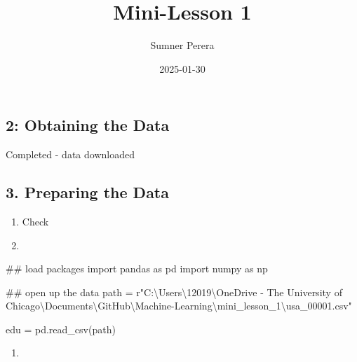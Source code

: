 \documentclass[
  letterpaper,
  DIV=11,
  numbers=noendperiod]{scrartcl}
\title{Mini-Lesson 1}
\author{Sumner Perera}
\date{2025-01-30}
\newenvironment{Shaded}{\begin{snugshade}}{\end{snugshade}}
\newcommand{\CommentTok}[1]{\textcolor[rgb]{0.37,0.37,0.37}{#1}}
\newcommand{\ImportTok}[1]{\textcolor[rgb]{0.00,0.46,0.62}{#1}}
\newcommand{\NormalTok}[1]{\textcolor[rgb]{0.00,0.23,0.31}{#1}}
\newcommand{\OperatorTok}[1]{\textcolor[rgb]{0.37,0.37,0.37}{#1}}
\newcommand{\VerbatimStringTok}[1]{\textcolor[rgb]{0.13,0.47,0.30}{#1}}
\providecommand{\tightlist}{%
  \setlength{\itemsep}{0pt}\setlength{\parskip}{0pt}}\usepackage{longtable,booktabs,array}
\begin{document}
\maketitle


\subsection{2: Obtaining the Data}\label{obtaining-the-data}

Completed - data downloaded

\subsection{3. Preparing the Data}\label{preparing-the-data}

\begin{enumerate}
\def\labelenumi{\arabic{enumi}.}
\tightlist
\item
  Check
\item
\end{enumerate}

\begin{Shaded}
\begin{Highlighting}[]
\CommentTok{\#\# load packages }
\ImportTok{import}\NormalTok{ pandas }\ImportTok{as}\NormalTok{ pd }
\ImportTok{import}\NormalTok{ numpy }\ImportTok{as}\NormalTok{ np }
\end{Highlighting}
\end{Shaded}

\begin{Shaded}
\begin{Highlighting}[]
\CommentTok{\#\# open up the data }
\NormalTok{path }\OperatorTok{=} \VerbatimStringTok{r"C:\textbackslash{}Users\textbackslash{}12019\textbackslash{}OneDrive {-} The University of Chicago\textbackslash{}Documents\textbackslash{}GitHub\textbackslash{}Machine{-}Learning\textbackslash{}mini\_lesson\_1\textbackslash{}usa\_00001.csv"}

\NormalTok{edu }\OperatorTok{=}\NormalTok{ pd.read\_csv(path)}
\end{Highlighting}
\end{Shaded}

\begin{enumerate}
\def\labelenumi{\alph{enumi}.}
\tightlist
\item
\end{enumerate}
\end{document}
